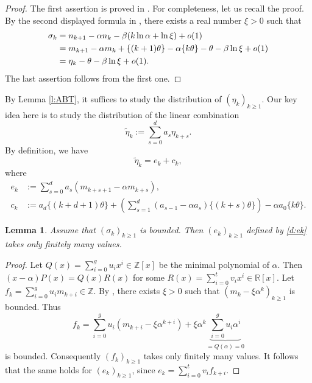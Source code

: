 \documentclass[12pt,centertags,oneside]{amsart}
\newtheorem{lemma}[theorem]{Lemma}
\theoremstyle{definition}
\newcommand{\R}{\mathbb{R}}
\newcommand{\Z}{\mathbb{Z}}
\renewcommand{\ge}{\geqslant}
\begin{document}
\begin{proof} 
The first assertion is proved in \cite[Remark~10.9]{Astorg-Boc 
Thaler-2024}. For completeness, let us recall the proof. By the second 
displayed formula in \cite[Lemma~10.1]{Astorg-Boc Thaler-2024}, there 
exists a real number $\xi>0$ such that 
\begin{align}\label{e:sigma-eta}
\sigma_k&=n_{k+1}-\alpha n_k-\beta(k\ln\alpha+\ln\xi)+o(1)\\
\notag&=m_{k+1}-\alpha m_k+\{(k+1)\theta\}-\alpha\{k\theta\}-\theta-\beta\ln\xi+o(1)\\
\notag&=\eta_k-\theta-\beta\ln\xi+o(1).
\end{align}
The last assertion follows from the first one. 
\end{proof}

By Lemma \ref{l:ABT}, it suffices to study the distribution of 
$(\eta_k)_{k\ge 1}$. Our key idea here is to study the distribution of the 
linear combination
\begin{equation}\label{d:tildek}
\tilde{\eta}_k:=\sum\limits_{s=0}^d a_s \eta_{k+s}.
\end{equation}
By definition, we have
\begin{equation}\label{ekck}
\tilde{\eta}_k=e_{k} + c_k,
\end{equation}
where
\begin{align}\label{d:ek}
e_k&:=\sum\limits_{s=0}^d a_{s} (m_{k+s+1}-\alpha m_{k+s}),\\
\label{d:ck}
c_k&:=a_d\{(k+d+1)\theta\}
+
\left(\sum\limits_{s=1}^{d}(a_{s-1}-\alpha a_s)\{(k+s)\theta\}\right)
-\alpha a_0 \{k\theta\}.
\end{align}

\begin{lemma}\label{L:ek}
Assume that $(\sigma_k)_{k\geqslant 1}$ is bounded. Then $(e_k)_{k\geqslant 
1}$ defined by \eqref{d:ek} takes only finitely many values. 
\end{lemma}

\begin{proof} 
Let $Q(x)=\sum_{i=0}^g u_ix^i\in \Z[x]$ be the minimal polynomial of 
$\alpha$. Then $(x-\alpha)P(x)=Q(x)R(x)$ for some $R(x)=\sum_{i=0}^t 
v_ix^i\in \R[x]$. Let $f_k=\sum_{i=0}^g u_i m_{k+i}\in \Z$. By \cite[Lemma 
10.1]{Astorg-Boc Thaler-2024}, there exists $\xi>0$ such that 
$(m_k-\xi\alpha^k)_{k\ge 1}$ is bounded. Thus 
\[f_k=\sum_{i=0}^g u_i (m_{k+i}-\xi\alpha^{k+i})+\xi\alpha^k\underbrace{\sum_{i=0}^g u_i \alpha^i}_{=Q(\alpha)=0}\]
is bounded. Consequently $(f_k)_{k\ge 1}$ takes only finitely many values. It 
follows that the same holds for $(e_k)_{k\ge 1}$, since $e_k=\sum_{i=0}^t 
v_if_{k+i}$. 
\end{proof} 
\end{document}

